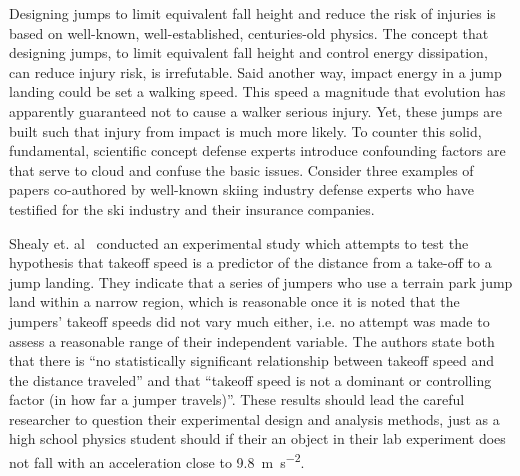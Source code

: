 \documentclass{article}
\begin{document}
Designing jumps to limit equivalent fall height and reduce the risk of injuries
is based on well-known, well-established, centuries-old physics. The concept that designing
jumps, to limit equivalent fall height and control energy dissipation,
can reduce injury risk, is irrefutable. Said another way, impact energy
in a jump landing could be set a walking speed. This speed a magnitude that
evolution has apparently guaranteed not to cause a walker serious injury. Yet, these jumps are built such that
injury from impact is much more likely. To counter this solid, fundamental,
scientific concept defense experts introduce confounding factors are that serve to cloud and confuse the basic issues. Consider three examples of
papers co-authored by well-known skiing industry defense experts who have testified for the ski
industry and their insurance companies.

Shealy et. al~\cite{Shealy2010} conducted an experimental study which attempts
to test the hypothesis that takeoff speed is a predictor of the distance from a take-off to a jump landing. They indicate that a series of jumpers who use a terrain park jump
land within a narrow region, which is reasonable once it is noted that the
jumpers' takeoff speeds did not vary much either, i.e. no attempt was made to assess a
reasonable range of their independent variable. The authors state both that there
is ``no statistically significant relationship between takeoff speed and the
distance traveled'' and that ``takeoff speed is not a dominant or controlling
factor (in how far a jumper travels)''. These results should lead the careful
researcher to question their experimental design and analysis methods, just as
a high school physics student should if their an object in their lab experiment does not fall with an
acceleration close to 9.8~\si{\meter\per\second\squared}.
\end{document}
